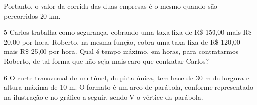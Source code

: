 \begin{escolha}
\begin{boxmedio}
\begin{boxmedio}
{\begin{boxpeq}
\begin{boxpeq}
{\begin{boxpeq}
\begin{boxmedio}
\begin{boxmedio}
\begin{boxpeq}
\begin{boxmedio}
\begin{boxpeq}
\begin{boxpeq}
\begin{boxpeq}
\begin{boxpeq}
\begin{boxmedio}
{\begin{boxmedio}
\begin{boxmedio}
\begin{boxpeq}
\begin{boxmedio}
\begin{boxpeq}
\begin{boxpeq}
\begin{boxpeq}
\begin{escolha}
{\begin{boxmedio}
\begin{boxpeq}
\begin{boxpeq}
\begin{boxpeq}
\begin{boxpeq}
\begin{boxpeq}
\begin{boxmedio}
\begin{boxpeq}
\begin{boxpeq}
\begin{boxpeq}
{\begin{boxpeq}
\begin{boxmedio}
\begin{boxpeq}
\begin{boxpeq}
\begin{boxpeq}
{\begin{boxpeq}
\begin{boxmedio}
{\begin{boxpeq}
\begin{boxpeq}
\begin{boxmedio}
\begin{boxmedio}
{Portanto, o valor da corrida das duas empresas é o mesmo quando são 
percorridos 20 km.}

\num{5} Carlos trabalha como segurança, cobrando uma taxa fixa de R\$ 150,00 mais
R\$ 20,00 por hora. Roberto, na mesma função, cobra uma taxa fixa de R\$ 120,00
mais R\$ 25,00 por hora. Qual é tempo máximo, em horas, para contratarmos Roberto,
de tal forma que não seja mais caro que contratar Carlos?

\begin{boxpeq}


\num{6} O corte transversal de um túnel, de pista única, tem base de 30 m de largura
e altura máxima de 10 m. O formato é um arco de parábola, conforme representado na
ilustração e no gráfico a seguir, sendo V o vértice da parábola.


\end{boxpeq}
\end{boxmedio}
\end{boxmedio}
\end{boxpeq}
\end{boxpeq}}
\end{boxmedio}
\end{boxpeq}}
\end{boxpeq}
\end{boxpeq}
\end{boxpeq}
\end{boxmedio}
\end{boxpeq}}
\end{boxpeq}
\end{boxpeq}
\end{boxpeq}
\end{boxmedio}
\end{boxpeq}
\end{boxpeq}
\end{boxpeq}
\end{boxpeq}
\end{boxpeq}
\end{boxmedio}}
\end{escolha}
\end{boxpeq}
\end{boxpeq}
\end{boxpeq}
\end{boxmedio}
\end{boxpeq}
\end{boxmedio}
\end{boxmedio}}
\end{boxmedio}
\end{boxpeq}
\end{boxpeq}
\end{boxpeq}
\end{boxpeq}
\end{boxmedio}
\end{boxpeq}
\end{boxmedio}
\end{boxmedio}
\end{boxpeq}}
\end{boxpeq}
\end{boxpeq}}
\end{boxmedio}
\end{boxmedio}
\end{escolha}
